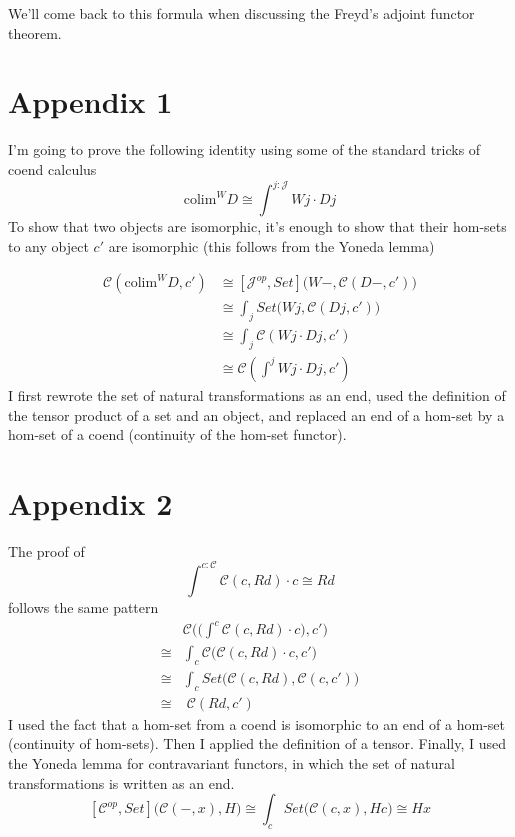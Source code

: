 \documentclass[11pt]{amsart}
\begin{document}
We'll come back to this formula when discussing the Freyd's adjoint functor theorem.

\section{Appendix 1}
I'm going to prove the following identity using some of the standard tricks of coend calculus
\[\mbox{colim}^W D \cong \int^{j \colon \mathcal{J}} W j \cdot D j\]
To show that two objects are isomorphic, it's enough to show that their hom-sets to any object $c'$ are isomorphic (this follows from the Yoneda lemma) 

\begin{align*}
\mathcal{C}(\mbox{colim}^W D, c') & \cong [\mathcal{J}^{op}, Set]\big(W-, \mathcal{C}(D -, c')\big) \\
 &\cong \int_j Set \big(W j, \mathcal{C}(D j, c')\big) \\
 &\cong \int_j \mathcal{C}(W j \cdot D j, c') \\
 &\cong \mathcal{C}(\int^j W j \cdot D j, c')
\end{align*}
I first rewrote the set of natural transformations as an end, used the definition of the tensor product of a set and an object, and replaced an end of a hom-set by a hom-set of a coend (continuity of the hom-set functor).

\section{Appendix 2}
The proof of
\[ \int^{c \colon \mathcal{C}} \mathcal{C}(c, R d) \cdot c \cong R d\]
follows the same pattern
\begin{align*}
&\mathcal{C}\Big( \big(\int^{c} \mathcal{C}(c, R d) \cdot c\big) , c'\Big)\\
\cong &\int_c \mathcal{C}\big( \mathcal{C}(c, R d) \cdot c , c'\big) \\
\cong &\int_c Set\big( \mathcal{C}(c, R d) , \mathcal{C}(c, c')\big) \\
\cong & \; \mathcal{C}(R d, c') 
\end{align*}
I used the fact that a hom-set from a coend is isomorphic to an end of a hom-set (continuity of hom-sets). Then I applied the definition of a tensor. Finally, I used the Yoneda lemma for contravariant functors, in which the set of natural transformations is written as an end. 
\[ [ \mathcal{C}^{op}, Set]\big(\mathcal{C}(-, x), H \big) \cong \int_c Set \big( \mathcal{C}(c, x), H c \big) \cong H x\]
\end{document}
